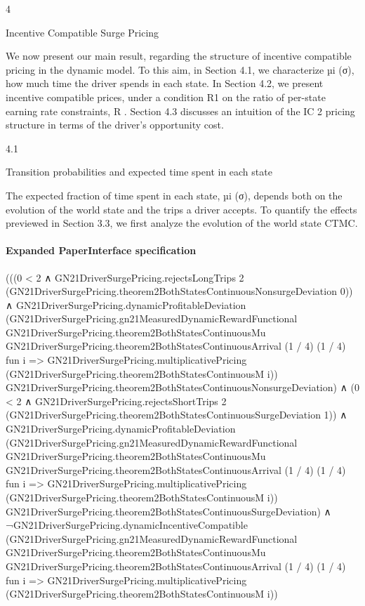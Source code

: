 \documentclass[10pt]{article}
\begin{document}
\begin{ReviewVerbatim}
4

Incentive Compatible Surge Pricing

We now present our main result, regarding the structure of incentive compatible pricing in the
dynamic model. To this aim, in Section 4.1, we characterize µi (σ), how much time the driver
spends in each state. In Section 4.2, we present incentive compatible prices, under a condition
R1
on the ratio of per-state earning rate constraints, R
. Section 4.3 discusses an intuition of the IC
2
pricing structure in terms of the driver’s opportunity cost.

4.1

Transition probabilities and expected time spent in each state

The expected fraction of time spent in each state, µi (σ), depends both on the evolution of the
world state and the trips a driver accepts. To quantify the effects previewed in Section 3.3, we first
analyze the evolution of the world state CTMC.
\end{ReviewVerbatim}


\paragraph{Expanded PaperInterface specification}
\begin{ReviewVerbatim}
(((0 < 2 ∧
        GN21DriverSurgePricing.rejectsLongTrips 2
          (GN21DriverSurgePricing.theorem2BothStatesContinuousNonsurgeDeviation 0)) ∧
      GN21DriverSurgePricing.dynamicProfitableDeviation
        (GN21DriverSurgePricing.gn21MeasuredDynamicRewardFunctional
          GN21DriverSurgePricing.theorem2BothStatesContinuousMu
          GN21DriverSurgePricing.theorem2BothStatesContinuousArrival (1 / 4) (1 / 4) fun i =>
          GN21DriverSurgePricing.multiplicativePricing (GN21DriverSurgePricing.theorem2BothStatesContinuousM i))
        GN21DriverSurgePricing.theorem2BothStatesContinuousNonsurgeDeviation) ∧
    (0 < 2 ∧
        GN21DriverSurgePricing.rejectsShortTrips 2
          (GN21DriverSurgePricing.theorem2BothStatesContinuousSurgeDeviation 1)) ∧
      GN21DriverSurgePricing.dynamicProfitableDeviation
        (GN21DriverSurgePricing.gn21MeasuredDynamicRewardFunctional
          GN21DriverSurgePricing.theorem2BothStatesContinuousMu
          GN21DriverSurgePricing.theorem2BothStatesContinuousArrival (1 / 4) (1 / 4) fun i =>
          GN21DriverSurgePricing.multiplicativePricing (GN21DriverSurgePricing.theorem2BothStatesContinuousM i))
        GN21DriverSurgePricing.theorem2BothStatesContinuousSurgeDeviation) ∧
  ¬GN21DriverSurgePricing.dynamicIncentiveCompatible
      (GN21DriverSurgePricing.gn21MeasuredDynamicRewardFunctional GN21DriverSurgePricing.theorem2BothStatesContinuousMu
        GN21DriverSurgePricing.theorem2BothStatesContinuousArrival (1 / 4) (1 / 4) fun i =>
        GN21DriverSurgePricing.multiplicativePricing (GN21DriverSurgePricing.theorem2BothStatesContinuousM i))
\end{ReviewVerbatim}
\end{document}
